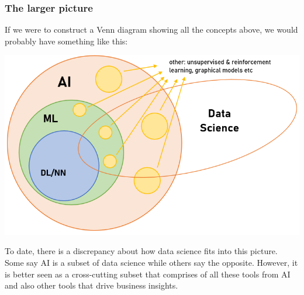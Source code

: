 \documentclass{article}[a4paper,12pt]
\theoremstyle{definition}
\begin{document}
\subsubsection{The larger picture}
If we were to construct a Venn diagram showing all the concepts above, we would probably have something like this:
\begin{center}\includegraphics[scale=0.8]{ai_terminology.png}\end{center}
To date, there is a discrepancy about how data science fits into this picture. Some say AI is a subset of data science while others say the opposite. However, it is better seen as a cross-cutting subset that comprises of all these tools from AI and also other tools that drive business insights.
\end{document}
